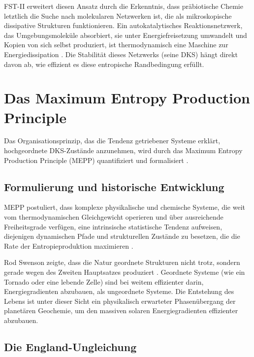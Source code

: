 \documentclass[12pt,a4paper]{article}
\theoremstyle{remark}
\begin{document}
FST-II erweitert diesen Ansatz durch die Erkenntnis, dass pr\"abiotische Chemie letztlich die Suche nach molekularen Netzwerken ist, die als mikroskopische dissipative Strukturen funktionieren. Ein autokatalytisches Reaktionsnetzwerk, das Umgebungsmolek\"ule absorbiert, sie unter Energiefreisetzung umwandelt und Kopien von sich selbst produziert, ist thermodynamisch eine Maschine zur Energiedissipation \citep{Bioenergetics}. Die Stabilit\"at dieses Netzwerks (seine DKS) h\"angt direkt davon ab, wie effizient es diese entropische Randbedingung erf\"ullt.

\section{Das Maximum Entropy Production Principle}
\label{sec:mepp}

Das Organisationsprinzip, das die Tendenz getriebener Systeme erkl\"art, hochgeordnete DKS-Zust\"ande anzunehmen, wird durch das Maximum Entropy Production Principle (MEPP) quantifiziert und formalisiert \citep{EntropyMEPP,MEPP2006}.

\subsection{Formulierung und historische Entwicklung}

MEPP postuliert, dass komplexe physikalische und chemische Systeme, die weit vom thermodynamischen Gleichgewicht operieren und \"uber ausreichende Freiheitsgrade verf\"ugen, eine intrinsische statistische Tendenz aufweisen, diejenigen dynamischen Pfade und strukturellen Zust\"ande zu besetzen, die die Rate der Entropieproduktion maximieren \citep{ThermodynamicsOrganisms}.

Rod Swenson zeigte, dass die Natur geordnete Strukturen nicht trotz, sondern gerade wegen des Zweiten Hauptsatzes produziert \citep{ThermodynamicsLife}. Geordnete Systeme (wie ein Tornado oder eine lebende Zelle) sind bei weitem effizienter darin, Energiegradienten abzubauen, als ungeordnete Systeme. Die Entstehung des Lebens ist unter dieser Sicht ein physikalisch erwarteter Phasen\"ubergang der planet\"aren Geochemie, um den massiven solaren Energiegradienten effizienter abzubauen.

\subsection{Die England-Ungleichung}
\end{document}
